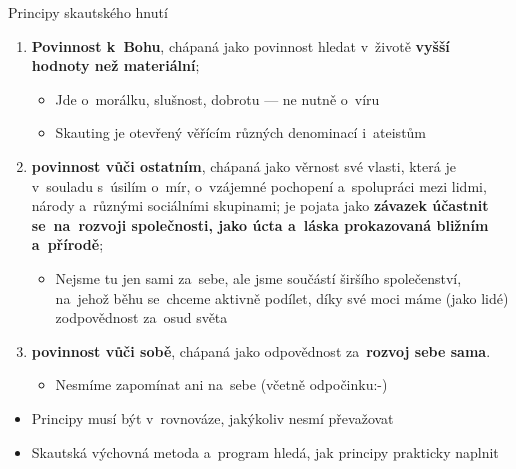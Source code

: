 \documentclass[compress, xelatex, 11pt, xcolor=dvipsnames, aspectratio=169, url={hyphens, lowtilde}]{beamer}
\begin{document}
\begin{frame}{Principy skautského hnutí}
	\begin{enumerate}
		\item \textbf{Povinnost k~Bohu}, chápaná jako povinnost hledat v~životě \textbf{vyšší hodnoty než materiální};
		\begin{itemize}
			\item Jde o~morálku, slušnost, dobrotu --- ne nutně o~víru
			\item Skauting je otevřený věřícím různých denominací i~ateistům
		\end{itemize}
		\item \textbf{povinnost vůči ostatním}, chápaná jako věrnost své vlasti, která je v~souladu s~úsilím o~mír, o~vzájemné pochopení a~spolupráci mezi lidmi, národy a~různými sociálními skupinami; je pojata jako \textbf{závazek účastnit se~na~rozvoji společnosti, jako úcta a~láska prokazovaná bližním a~přírodě};
		\begin{itemize}
			\item Nejsme tu jen sami za~sebe, ale jsme součástí širšího společenství, na~jehož běhu se~chceme aktivně podílet, díky své moci máme (jako lidé) zodpovědnost za~osud světa
		\end{itemize}
		\item \textbf{povinnost vůči sobě}, chápaná jako odpovědnost za~\textbf{rozvoj sebe sama}.
		\begin{itemize}
			\item Nesmíme zapomínat ani na~sebe (včetně odpočinku:-)
		\end{itemize}
	\end{enumerate}
	\vfill
	\begin{itemize}
		\item Principy musí být v~rovnováze, jakýkoliv nesmí převažovat
		\item Skautská výchovná metoda a~program hledá, jak principy prakticky naplnit
	\end{itemize}
\end{frame}
\end{document}
